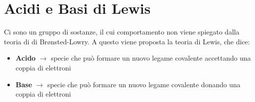 \section{Acidi e Basi di Lewis}
Ci sono un gruppo di sostanze, il cui comportamento non viene spiegato dalla teoria di di Br{\o}nsted-Lowry. A questo viene proposta la teoria di Lewis, che dice:
\begin{itemize}[ ]
	\item \textbf{Acido} \(\rightarrow\) specie che può formare un nuovo legame covalente accettando una coppia di elettroni
	\item \textbf{Base} \(\rightarrow\) specie che può formare un nuovo legame covalente donando una coppia di elettroni
\end{itemize}